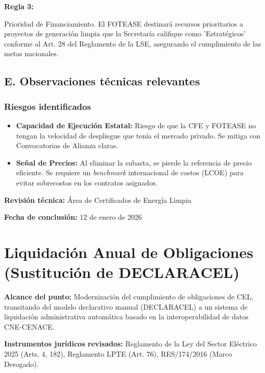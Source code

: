 \documentclass{cel}
\begin{document}
\textbf{Regla 3:}

\textquotedbl{}Prioridad de Financiamiento. El FOTEASE destinará recursos prioritarios a proyectos de generación limpia que la Secretaría califique como 'Estratégicos' conforme al Art. 28 del Reglamento de la LSE, asegurando el cumplimiento de las metas nacionales.\textquotedbl{}


\subsection{E. Observaciones técnicas relevantes}
\nopagebreak

\subsubsection{Riesgos identificados}
\nopagebreak

\begin{itemize}
\item \textbf{Capacidad de Ejecución Estatal:} Riesgo de que la CFE y FOTEASE no tengan la velocidad de despliegue que tenía el mercado privado. Se mitiga con \textquotedbl{}Convocatorias de Alianza\textquotedbl{} claras.
\item \textbf{Señal de Precios:} Al eliminar la subasta, se pierde la referencia de \textquotedbl{}precio eficiente\textquotedbl{}. Se requiere un \textit{benchmark} internacional de costos (LCOE) para evitar sobrecostos en los contratos asignados.


\end{itemize}
\textbf{Revisión técnica:} Área de Certificados de Energía Limpia

\textbf{Fecha de conclusión:} 12 de enero de 2026


\clearpage
{}
{}
\section*{Liquidación Anual de Obligaciones (Sustitución de DECLARACEL)}
\nopagebreak

\textbf{Alcance del punto:} Modernización del cumplimiento de obligaciones de CEL, transitando del modelo declarativo manual (DECLARACEL) a un sistema de liquidación administrativa automática basado en la interoperabilidad de datos CNE-CENACE.

\textbf{Instrumentos jurídicos revisados:} Reglamento de la Ley del Sector Eléctrico 2025 (Arts. 4, 182), Reglamento LPTE (Art. 76), RES/174/2016 (Marco Derogado).
\end{document}
